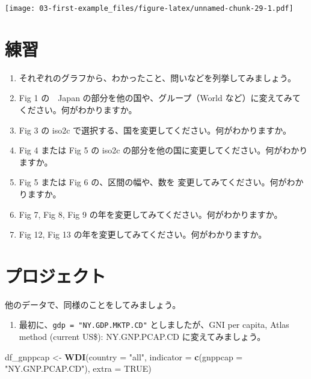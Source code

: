 \documentclass[
  xelatex, ja=standard]{bxjsbook}
\newenvironment{Shaded}{\begin{snugshade}}{\end{snugshade}}
\newcommand{\AttributeTok}[1]{\textcolor[rgb]{0.13,0.29,0.53}{#1}}
\newcommand{\ConstantTok}[1]{\textcolor[rgb]{0.56,0.35,0.01}{#1}}
\newcommand{\FunctionTok}[1]{\textcolor[rgb]{0.13,0.29,0.53}{\textbf{#1}}}
\newcommand{\NormalTok}[1]{#1}
\newcommand{\OtherTok}[1]{\textcolor[rgb]{0.56,0.35,0.01}{#1}}
\newcommand{\StringTok}[1]{\textcolor[rgb]{0.31,0.60,0.02}{#1}}
\providecommand{\tightlist}{%
  \setlength{\itemsep}{0pt}\setlength{\parskip}{0pt}}
\theoremstyle{definition}
\theoremstyle{definition}
\theoremstyle{definition}
\theoremstyle{definition}
\theoremstyle{remark}
\begin{document}
\texttt{[image: 03-first-example\_files/figure-latex/unnamed-chunk-29-1.pdf]}

\hypertarget{ux7df4ux7fd2}{%
\section{練習}\label{ux7df4ux7fd2}}

\begin{enumerate}
\def\labelenumi{\arabic{enumi}.}
\tightlist
\item
  それぞれのグラフから、わかったこと、問いなどを列挙してみましょう。
\item
  Fig 1 の　Japan の部分を他の国や、グループ（World など）に変えてみてください。何がわかりますか。
\item
  Fig 3 の iso2c で選択する、国を変更してください。何がわかりますか。
\item
  Fig 4 または Fig 5 の iso2c の部分を他の国に変更してください。何がわかりますか。
\item
  Fig 5 または Fig 6 の、区間の幅や、数を 変更してみてください。何がわかりますか。
\item
  Fig 7, Fig 8, Fig 9 の年を変更してみてください。何がわかりますか。
\item
  Fig 12, Fig 13 の年を変更してみてください。何がわかりますか。
\end{enumerate}

\hypertarget{ux30d7ux30edux30b8ux30a7ux30afux30c8}{%
\section{プロジェクト}\label{ux30d7ux30edux30b8ux30a7ux30afux30c8}}

他のデータで、同様のことをしてみましょう。

\begin{enumerate}
\def\labelenumi{\arabic{enumi}.}
\tightlist
\item
  最初に、\texttt{gdp\ =\ "NY.GDP.MKTP.CD"} としましたが、GNI per capita, Atlas method (current US\$): NY.GNP.PCAP.CD に変えてみましょう。
\end{enumerate}

\begin{Shaded}
\begin{Highlighting}[]
\NormalTok{df\_gnppcap }\OtherTok{\textless{}{-}} \FunctionTok{WDI}\NormalTok{(}\AttributeTok{country =} \StringTok{"all"}\NormalTok{, }
              \AttributeTok{indicator =} \FunctionTok{c}\NormalTok{(}\AttributeTok{gnppcap =} \StringTok{"NY.GNP.PCAP.CD"}\NormalTok{), }
              \AttributeTok{extra =} \ConstantTok{TRUE}\NormalTok{)}
\end{Highlighting}
\end{Shaded}
\end{document}
